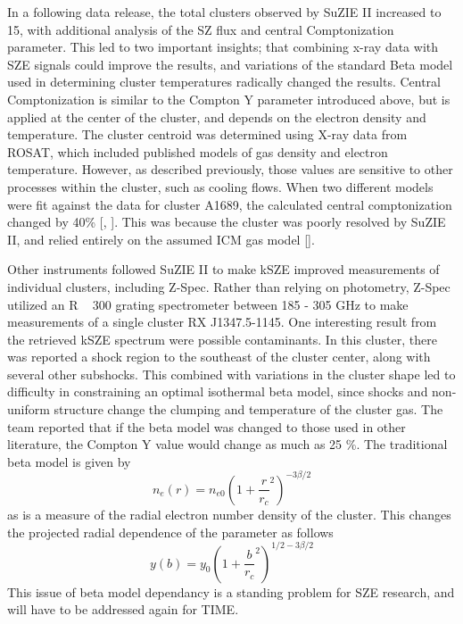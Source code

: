 \documentclass[manuscript]{aastex}
\begin{document}
In a following data release, the total clusters observed by SuZIE II increased to 15, with additional analysis of the SZ flux and central Comptonization parameter. This led to two important insights; that combining x-ray data with SZE signals could improve the results, and variations of the standard Beta model used in determining cluster temperatures radically changed the results. Central Comptonization is similar to the Compton Y parameter introduced above, but is applied at the center of the cluster, and depends on the electron density and temperature. The cluster centroid was determined using X-ray data from ROSAT, which included published models of gas density and electron temperature. However, as described previously, those values are sensitive to other processes within the cluster, such as cooling flows. When two different models were fit against the data for cluster A1689, the calculated central comptonization changed by 40\% [\cite{Holzapfel et al. 1997b}, \cite{Reese et al. 2002}]. This was because the cluster was poorly resolved by SuZIE II, and relied entirely on the assumed ICM gas model [\cite{Benson2004}]. 

Other instruments followed SuZIE II to make kSZE improved measurements of individual clusters, including Z-Spec. Rather than relying on photometry, Z-Spec utilized an R ~ 300 grating spectrometer between 185 - 305 GHz to make measurements of a single cluster RX J1347.5-1145. One interesting result from the retrieved kSZE spectrum were possible contaminants. In this cluster, there was reported a shock region to the southeast of the cluster center, along with several other subshocks. This combined with variations in the cluster shape led to difficulty in constraining an optimal isothermal beta model, since shocks and non-uniform structure change the clumping and temperature of the cluster gas. The team reported that if the beta model was changed to those used in other literature, the Compton Y value would change as much as 25 \%. The traditional beta model is given by 
\begin{equation}
    n_{e}(r) = n_{e0}(1 + \frac{r}{r_{c}}^{2})^{-3\beta/2}
\end{equation}
as is a measure of the radial electron number density of the cluster. This changes the projected radial dependence of the parameter as follows
\begin{equation}
    y(b) = y_{0}(1 + \frac{b}{r_{c}}^{2})^{1/2 - 3\beta/2}
\end{equation}
This issue of beta model dependancy is a standing problem for SZE research, and will have to be addressed again for TIME.
\end{document}
